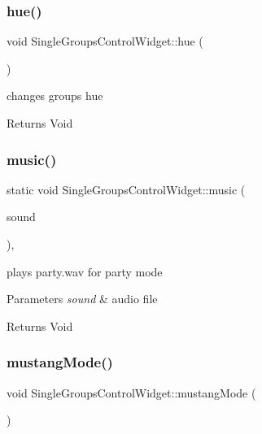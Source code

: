 \subsubsection{\texorpdfstring{hue()}{hue()}}
{\footnotesize\ttfamily void Single\+Groups\+Control\+Widget\+::hue (\begin{DoxyParamCaption}{ }\end{DoxyParamCaption})\hspace{0.3cm}{\ttfamily [private]}}



changes group\textquotesingle{}s hue 

\begin{DoxyReturn}{Returns}
Void 
\end{DoxyReturn}
\mbox{\label{class_single_groups_control_widget_adba20587e7d7afd7e7ef5d95b242579e}} 
\subsubsection{\texorpdfstring{music()}{music()}}
{\footnotesize\ttfamily static void Single\+Groups\+Control\+Widget\+::music (\begin{DoxyParamCaption}\item[{Wt\+::\+W\+Sound $\ast$}]{sound }\end{DoxyParamCaption})\hspace{0.3cm}{\ttfamily [static]}, {\ttfamily [private]}}



plays party.\+wav for party mode 


\begin{DoxyParams}{Parameters}
{\em sound} & audio file \\
\hline
\end{DoxyParams}
\begin{DoxyReturn}{Returns}
Void 
\end{DoxyReturn}
\mbox{\label{class_single_groups_control_widget_ad378bb04e410f93fd50eddc38c47d6d9}} 
\subsubsection{\texorpdfstring{mustang\+Mode()}{mustangMode()}}
{\footnotesize\ttfamily void Single\+Groups\+Control\+Widget\+::mustang\+Mode (\begin{DoxyParamCaption}{ }\end{DoxyParamCaption})\hspace{0.3cm}{\ttfamily [private]}}



